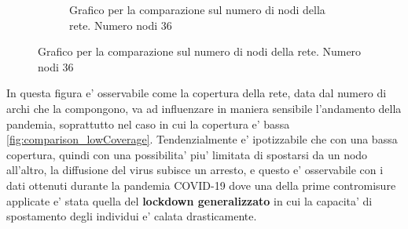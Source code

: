 \begin{figure}[!hb]
\begin{subfigure}[b]{0.45\textwidth}
		\caption{Grafico per la comparazione sul numero di nodi della rete. Numero nodi 36}
		\label{fig:comparison_numberOfNodes_36}
	\end{subfigure}
\end{figure}

\newpage

In questa figura e' osservabile come la copertura della rete, data dal numero di archi che la compongono,
va ad influenzare in maniera sensibile l'andamento della pandemia, soprattutto nel caso in cui la copertura e' 
bassa \ref{fig:comparison_lowCoverage}. Tendenzialmente e' ipotizzabile che con una bassa copertura, quindi 
con una possibilita' piu' limitata di spostarsi da un nodo all'altro, la diffusione del virus subisce un arresto, 
e questo e' osservabile con i dati ottenuti durante la pandemia COVID-19 dove una della prime contromisure applicate 
e' stata quella del \textbf{lockdown generalizzato} in cui la capacita' di spostamento degli individui 
e' calata drasticamente.

